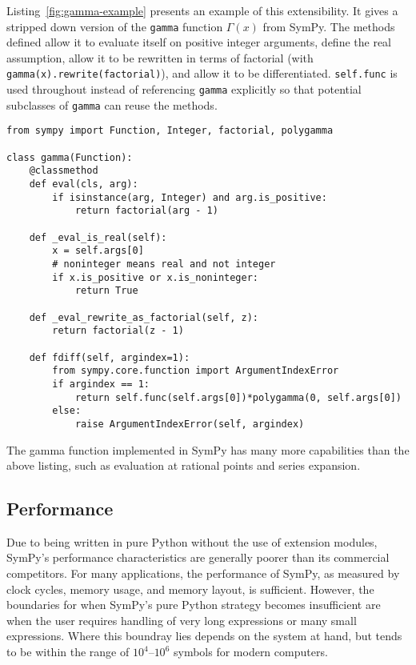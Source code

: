 Listing~\ref{fig:gamma-example} presents an example of this extensibility. It
gives a stripped down version of the \texttt{gamma} function $\Gamma(x)$ from
SymPy. The methods defined allow it to evaluate itself on positive integer
arguments, define the real assumption, allow it to be rewritten in terms of
factorial (with \verb|gamma(x).rewrite(factorial)|), and allow it to be
differentiated. \texttt{self.func} is used throughout instead of referencing
\texttt{gamma} explicitly so that potential subclasses of \texttt{gamma} can
reuse the methods.

\lstset{
  basicstyle=\ttfamily,
}

\begin{lstlisting}[caption={A minimal implementation of \texttt{sympy.gamma}.},label=fig:gamma-example]
from sympy import Function, Integer, factorial, polygamma

class gamma(Function):
    @classmethod
    def eval(cls, arg):
        if isinstance(arg, Integer) and arg.is_positive:
            return factorial(arg - 1)

    def _eval_is_real(self):
        x = self.args[0]
        # noninteger means real and not integer
        if x.is_positive or x.is_noninteger:
            return True

    def _eval_rewrite_as_factorial(self, z):
        return factorial(z - 1)

    def fdiff(self, argindex=1):
        from sympy.core.function import ArgumentIndexError
        if argindex == 1:
            return self.func(self.args[0])*polygamma(0, self.args[0])
        else:
            raise ArgumentIndexError(self, argindex)
\end{lstlisting}
The gamma function implemented in SymPy has many more capabilities than the
above listing, such as evaluation at rational points and series expansion.


\subsection{Performance}
\label{sec:performance}

Due to being written in pure Python without the use of extension modules,
SymPy's performance characteristics are generally poorer than
its commercial competitors. For many applications,
the performance of SymPy, as measured by clock cycles, memory usage, and memory
layout, is sufficient.
However, the boundaries for when SymPy's pure Python strategy becomes
insufficient are when the user requires handling of very long expressions or many
small expressions. Where this boundray lies depends on the system at hand, but tends
to be within the range of $10^4$--$10^6$ symbols for modern computers.

